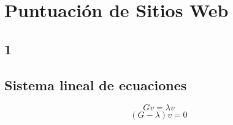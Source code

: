 \documentclass{article}
\begin{document}

\section{Puntuación de Sitios Web}

\subsection{1}
\subsection{Sistema lineal de ecuaciones}
\begin{equation} \label{eq:SLi}
Gv = \lambda v
\end{equation}
\begin{equation} \label{eq:SL}
(G-\lambda)v = 0
\end{equation}
\end{document}
